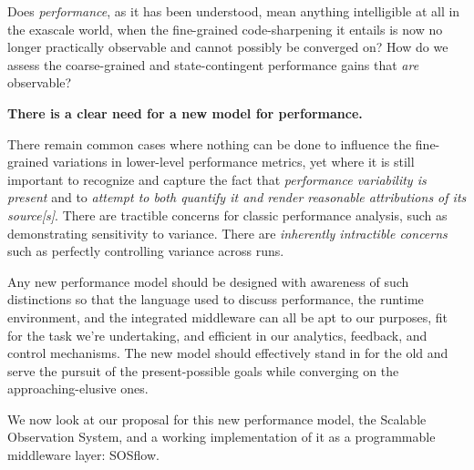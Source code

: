 Does \textit{performance}, as it has been understood, mean anything
intelligible at all in the exascale world, when the fine-grained
code-sharpening it entails is now no longer practically observable and
cannot possibly be converged on?
%
How do we assess the coarse-grained and state-contingent performance
gains that \textit{are} observable?

\textbf{There is a clear need for a new model for performance.}

There remain common cases where nothing can be done to influence the
fine-grained variations in lower-level performance metrics, yet where
it is still important to recognize and capture the fact that
\textit{performance variability is present} and to \textit{attempt to
  both quantify it and render reasonable attributions of its
  source[s]}.
%
There are tractible concerns for classic performance
analysis, such as demonstrating sensitivity to variance.
%
There are \textit{inherently intractible concerns} such as perfectly
controlling variance across runs.

Any new performance model should be designed with awareness of such
distinctions so that the language used to discuss performance, the
runtime environment, and the integrated middleware can all be apt
to our purposes, fit for the task we're undertaking, and efficient in
our analytics, feedback, and control mechanisms.
%
The new model should effectively stand in for the old and serve the
pursuit of the present-possible goals while converging on the
approaching-elusive ones.

We now look at our proposal for this new performance model, the
Scalable Observation System, and a working implementation of it
as a programmable middleware layer: SOSflow.


